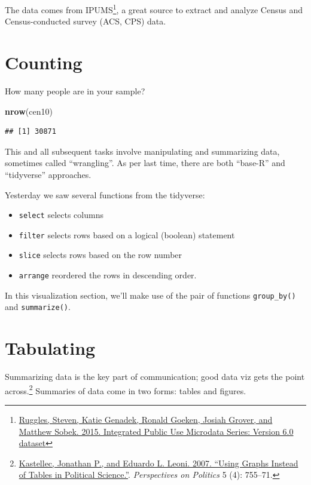 \documentclass[]{book}
\newenvironment{Shaded}{\begin{snugshade}}{\end{snugshade}}
\newcommand{\KeywordTok}[1]{\textcolor[rgb]{0.13,0.29,0.53}{\textbf{#1}}}
\newcommand{\NormalTok}[1]{#1}
\providecommand{\tightlist}{%
  \setlength{\itemsep}{0pt}\setlength{\parskip}{0pt}}
\let\rmarkdownfootnote\footnote%
\def\footnote{\protect\rmarkdownfootnote}
\theoremstyle{definition}
\theoremstyle{definition}
\theoremstyle{definition}
\theoremstyle{remark}
\begin{document}
\begin{Shaded}
\begin{Highlighting}[]
\begin{Shaded}
\begin{Highlighting}[]
The data comes from IPUMS\footnote{\href{http://doi.org/10.18128/D010.V6.0}{Ruggles, Steven, Katie Genadek, Ronald Goeken, Josiah Grover, and Matthew Sobek. 2015. Integrated Public Use Microdata Series: Version 6.0 dataset}}, a great source to extract and analyze Census and Census-conducted survey (ACS, CPS) data.

\hypertarget{counting}{%
\section{Counting}\label{counting}}

How many people are in your sample?

\begin{Shaded}
\begin{Highlighting}[]
\KeywordTok{nrow}\NormalTok{(cen10)}
\end{Highlighting}
\end{Shaded}

\begin{verbatim}
## [1] 30871
\end{verbatim}

This and all subsequent tasks involve manipulating and summarizing data, sometimes called ``wrangling''. As per last time, there are both ``base-R'' and ``tidyverse'' approaches.

Yesterday we saw several functions from the tidyverse:

\begin{itemize}
\tightlist
\item
  \texttt{select} selects columns
\item
  \texttt{filter} selects rows based on a logical (boolean) statement
\item
  \texttt{slice} selects rows based on the row number
\item
  \texttt{arrange} reordered the rows in descending order.
\end{itemize}

In this visualization section, we'll make use of the pair of functions \texttt{group\_by()} and \texttt{summarize()}.

\hypertarget{tabulating}{%
\section{Tabulating}\label{tabulating}}

Summarizing data is the key part of communication; good data viz gets the point across.\footnote{\href{http://www.princeton.edu/~jkastell/Tables2Graphs/graphs.pdf}{Kastellec, Jonathan P., and Eduardo L. Leoni. 2007. ``Using Graphs Instead of Tables in Political Science.''}. \emph{Perspectives on Politics} 5 (4): 755--71.} Summaries of data come in two forms: tables and figures.


\end{Highlighting}
\end{Shaded}
\end{Highlighting}
\end{Shaded}
\end{document}
